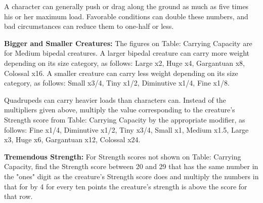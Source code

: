 A character can generally push or drag along the ground as much as five times his 
or her maximum load. Favorable conditions can double these numbers, and bad circumstances 
can reduce them to one-half or less.

\textbf{Bigger and Smaller Creatures:} The figures on Table: Carrying Capacity 
are for Medium bipedal creatures. A larger bipedal creature can carry more weight 
depending on its size category, as follows: Large x2, Huge x4, Gargantuan x8, Colossal 
x16. A smaller creature can carry less weight depending on its size category, as 
follows: Small x3/4, Tiny x1/2, Diminutive x1/4, Fine x1/8.

Quadrupeds can carry heavier loads than characters can. Instead of the multipliers 
given above, multiply the value corresponding to the creature's Strength score 
from Table: Carrying Capacity by the appropriate modifier, as follows: Fine x1/4, 
Diminutive x1/2, Tiny x3/4, Small x1, Medium x1.5, Large x3, Huge x6, Gargantuan 
x12, Colossal x24.

\textbf{Tremendous Strength:} For Strength scores not shown on Table: Carrying 
Capacity, find the Strength score between 20 and 29 that has the same number in 
the "ones" digit as the creature's Strength score does and multiply the numbers 
in that for by 4 for every ten points the creature's strength is above the score 
for that row.

